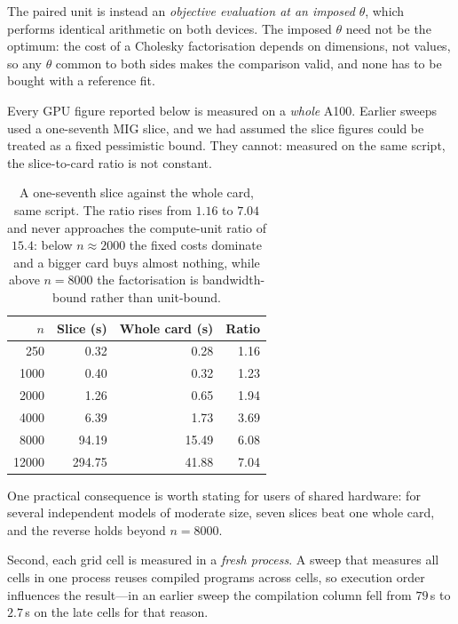 \documentclass[article]{jss}
\begin{document}
The paired unit is instead an \emph{objective evaluation at an imposed}
$\theta$, which performs identical arithmetic on both devices. The imposed
$\theta$ need not be the optimum: the cost of a Cholesky factorisation depends
on dimensions, not values, so any $\theta$ common to both sides makes the
comparison valid, and none has to be bought with a reference fit.

Every GPU figure reported below is measured on a \emph{whole} A100. Earlier
sweeps used a one-seventh MIG slice, and we had assumed the slice figures
could be treated as a fixed pessimistic bound. They cannot: measured on the
same script, the slice-to-card ratio is not constant.

\begin{table}[h]\centering
\begin{tabular}{rrrr}
\toprule
$n$ & Slice (s) & Whole card (s) & Ratio \\
\midrule
\phantom{0}\phantom{0}250 & \phantom{00}0.32 & \phantom{0}0.28 & 1.16 \\
\phantom{0}1000 & \phantom{00}0.40 & \phantom{0}0.32 & 1.23 \\
\phantom{0}2000 & \phantom{00}1.26 & \phantom{0}0.65 & 1.94 \\
\phantom{0}4000 & \phantom{00}6.39 & \phantom{0}1.73 & 3.69 \\
\phantom{0}8000 & \phantom{0}94.19 & 15.49 & 6.08 \\
12000 & 294.75 & 41.88 & 7.04 \\
\bottomrule
\end{tabular}
\caption{\label{tab:slice}A one-seventh slice against the whole card, same
script. The ratio rises from $1.16$ to $7.04$ and never approaches the
compute-unit ratio of $15.4$: below $n \approx 2000$ the fixed costs dominate
and a bigger card buys almost nothing, while above $n = 8000$ the
factorisation is bandwidth-bound rather than unit-bound.}
\end{table}

One practical consequence is worth stating for users of shared hardware: for
several independent models of moderate size, seven slices beat one whole
card, and the reverse holds beyond $n = 8000$.

Second, each grid cell is measured in a \emph{fresh process}. A sweep that
measures all cells in one process reuses compiled programs across cells, so
execution order influences the result---in an earlier sweep the compilation
column fell from $79$\,s to $2.7$\,s on the late cells for that reason.
\end{document}
